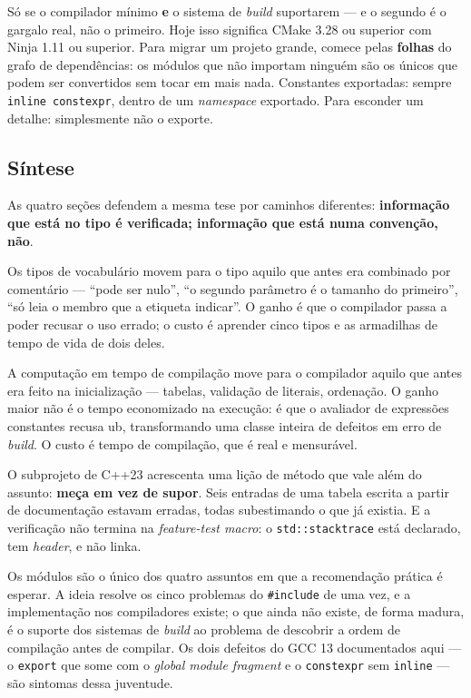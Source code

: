 \begin{regra}
Só se o compilador mínimo \textbf{e} o sistema de \emph{build} suportarem --- e
o segundo é o gargalo real, não o primeiro. Hoje isso significa CMake 3.28 ou
superior com Ninja 1.11 ou superior. Para migrar um projeto grande, comece pelas
\textbf{folhas} do grafo de dependências: os módulos que não importam ninguém
são os únicos que podem ser convertidos sem tocar em mais nada. Constantes
exportadas: sempre \texttt{inline constexpr}, dentro de um \emph{namespace}
exportado. Para esconder um detalhe: simplesmente não o exporte.
\end{regra}

\subsection{Síntese}
\label{sec:vocab-ct-sintese}

As quatro seções defendem a mesma tese por caminhos diferentes:
\textbf{informação que está no tipo é verificada; informação que está numa
convenção, não}.

Os tipos de vocabulário movem para o tipo aquilo que antes era combinado por
comentário --- ``pode ser nulo'', ``o segundo parâmetro é o tamanho do
primeiro'', ``só leia o membro que a etiqueta indicar''. O ganho é que o
compilador passa a poder recusar o uso errado; o custo é aprender cinco tipos e
as armadilhas de tempo de vida de dois deles.

A computação em tempo de compilação move para o compilador aquilo que antes era
feito na inicialização --- tabelas, validação de literais, ordenação. O ganho
maior não é o tempo economizado na execução: é que o avaliador de expressões
constantes recusa \gls{ub}, transformando uma classe inteira de defeitos em erro
de \emph{build}. O custo é tempo de compilação, que é real e mensurável.

O subprojeto de C++23 acrescenta uma lição de método que vale além do assunto:
\textbf{meça em vez de supor}. Seis entradas de uma tabela escrita a partir de
documentação estavam erradas, todas subestimando o que já existia. E a
verificação não termina na \emph{feature-test macro}: o \texttt{std::stacktrace}
está declarado, tem \emph{header}, e não linka.

Os módulos são o único dos quatro assuntos em que a recomendação prática é
esperar. A ideia resolve os cinco problemas do \texttt{\#include} de uma vez, e
a implementação nos compiladores existe; o que ainda não existe, de forma
madura, é o suporte dos sistemas de \emph{build} ao problema de descobrir a
ordem de compilação antes de compilar. Os dois defeitos do GCC 13 documentados
aqui --- o \texttt{export} que some com o \emph{global module fragment} e o
\texttt{constexpr} sem \texttt{inline} --- são sintomas dessa juventude.

